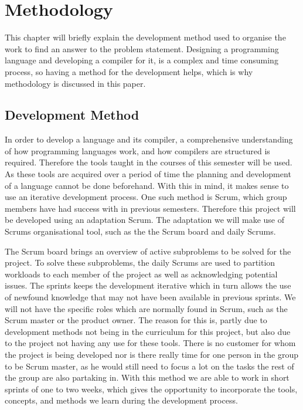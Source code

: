 \chapter{Methodology}\label{cha:methdology}   

This chapter will briefly explain the development method used to organise the work to find an answer to the problem statement. 
Designing a programming language and developing a compiler for it, is a complex and time consuming process, so having a method for the development helps, which is why methodology is discussed in this paper.

\section{Development Method}
In order to develop a language and its compiler, a comprehensive understanding of how programming languages work, and how compilers are structured is required.
Therefore the tools taught in the courses of this semester will be used.
As these tools are acquired over a period of time the planning and development of a language cannot be done beforehand.
With this in mind, it makes sense to use an iterative development process.
One such method is Scrum, which group members have had success with in previous semesters.
Therefore this project will be developed using an adaptation Scrum.
The adaptation we will make use of Scrums organisational tool, such as the the Scrum board and daily Scrums.

The Scrum board brings an overview of active subproblems to be solved for the project.
To solve these subproblems, the daily Scrums are used to partition workloads to each member of the project as well as acknowledging potential issues.
The sprints keeps the development iterative which in turn allows the use of newfound knowledge that may not have been available in previous sprints.
We will not have the specific roles which are normally found in Scrum, such as the Scrum master or the product owner. \citep{Scrum}
The reason for this is, partly due to development methods not being in the curriculum for this project, but also due to the project not having any use for these tools.
There is no customer for whom the project is being developed nor is there really time for one person in the group to be Scrum master, as he would still need to focus a lot on the tasks the rest of the group are also partaking in.
With this method we are able to work in short sprints of one to two weeks, which gives the opportunity to incorporate the tools, concepts, and methods we learn during the development process.


